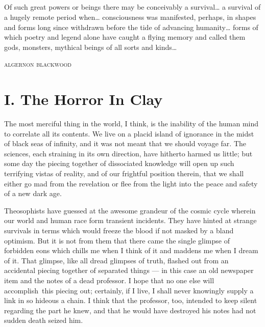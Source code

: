 
\section*{}
\thispagestyle{empty}

\epigraph{Of such great powers or beings there may be conceivably a
survival\ldots{} a survival of a hugely remote period when\ldots{}
consciousness was manifested, perhaps, in shapes and forms long since
withdrawn before the tide of advancing humanity\ldots{} forms of which
poetry and legend alone have caught a flying memory and called them
gods, monsters, mythical beings of all sorts and kinds\ldots{}}{\textsc{algernon blackwood}}

\pagebreak

{\let\clearpage\relax\chapter*{I. The Horror In Clay}}

\noindent{}The most merciful thing in the world, I think, is the inability of the
human mind to correlate all its contents. We live on a placid island of
ignorance in the midst of black seas of infinity, and it was not meant
that we should voyage far. The sciences, each straining in its own
direction, have hitherto harmed us little; but some day the piecing
together of dissociated knowledge will open up such terrifying vistas of
reality, and of our frightful position therein, that we shall either go
mad from the revelation or flee from the light into the peace and safety
of a new dark age.


Theosophists have guessed at the awesome grandeur of the cosmic cycle
wherein our world and human race form transient incidents. They have
hinted at strange survivals in terms which would freeze the blood if not
masked by a bland optimism. But it is not from them that there came the
single glimpse of forbidden eons which chills me when I think of it and
maddens me when I dream of it. That glimpse, like all dread glimpses of
truth, flashed out from an accidental piecing together of separated
things --- in this case an old newspaper item and the notes of a dead
professor. I hope that no one else will accomplish\est\ this piecing out;
certainly, if I live, I shall never knowingly supply a link in so
hideous a chain. I think that the professor, too, intended to keep
silent regarding the part he knew, and that he would have destroyed his
notes had not sudden death seized him.


